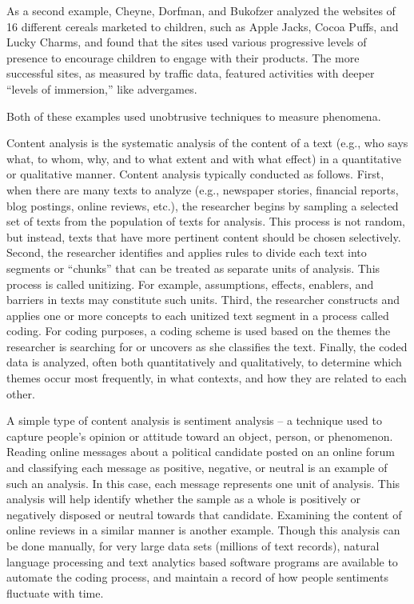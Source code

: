 As a second example, Cheyne, Dorfman, and Bukofzer \cite{cheyne2013marketing} analyzed the websites of 16 different cereals marketed to children, such as Apple Jacks, Cocoa Puffs, and Lucky Charms, and found that the sites used various progressive levels of presence to encourage children to engage with their products. The more successful sites, as measured by traffic data, featured activities with deeper ``levels of immersion,'' like advergames.

Both of these examples used unobtrusive techniques to measure phenomena. 

Content analysis is the systematic analysis of the content of a text (e.g., who says what, to whom, why, and to what extent and with what effect) in a quantitative or qualitative manner. Content analysis typically conducted as follows. First, when there are many texts to analyze (e.g., newspaper stories, financial reports, blog postings, online reviews, etc.), the researcher begins by sampling a selected set of texts from the population of texts for analysis. This process is not random, but instead, texts that have more pertinent content should be chosen selectively. Second, the researcher identifies and applies rules to divide each text into segments or “chunks” that can be treated as separate units of analysis. This process is called unitizing. For example, assumptions, effects, enablers, and barriers in texts may constitute such units. Third, the researcher constructs and applies one or more concepts to each unitized text segment in a process called coding. For coding purposes, a coding scheme is used based on the themes the researcher is searching for or uncovers as she classifies the text. Finally, the coded data is analyzed, often both quantitatively and qualitatively, to determine which themes occur most frequently, in what contexts, and how they are related to each other.

A simple type of content analysis is sentiment analysis – a technique used to capture people’s opinion or attitude toward an object, person, or phenomenon. Reading online messages about a political candidate posted on an online forum and classifying each message as positive, negative, or neutral is an example of such an analysis. In this case, each message represents one unit of analysis. This analysis will help identify whether the sample as a whole is positively or negatively disposed or neutral towards that candidate. Examining the content of online reviews in a similar manner is another example. Though this analysis can be done manually, for very large data sets (millions of text records), natural language processing and text analytics based software programs are available to automate the coding process, and maintain a record of how people sentiments fluctuate with time.


